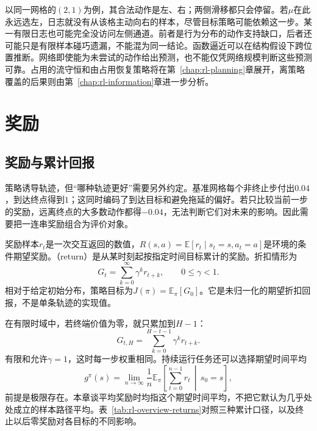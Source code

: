 以同一网格的$(2,1)$为例，其合法动作是左、右；两侧滑移都只会停留。若$\mu$在此永远选左，日志就没有从该格主动向右的样本，尽管目标策略可能依赖这一步。某一有限日志也可能完全没访问左侧通道。前者是行为分布的动作支持缺口，后者还可能只是有限样本碰巧遗漏，不能混为同一结论。函数逼近可以在结构假设下跨位置推断。网络即使能为未尝试的动作给出预测，也不能仅凭网络规模判断这些预测可靠。占用的流守恒和由占用恢复策略将在第~\ref{chap:rl-planning}章展开，离策略覆盖的后果则由第~\ref{chap:rl-information}章进一步分析。

\section{奖励}
\label{sec:rl-overview-rewards}

\subsection{奖励与累计回报}
\label{sec:rl-overview-return}

策略诱导轨迹，但“哪种轨迹更好”需要另外约定。基准网格每个非终止步付出$0.04$，到达终点得到$1$；这同时编码了到达目标和避免拖延的偏好。若只比较当前一步的奖励，远离终点的大多数动作都得$-0.04$，无法判断它们对未来的影响。因此需要把一连串奖励组合为评价对象。

\begin{definition}[回报与策略目标]
  \label{def:rl-overview-return}
  奖励样本$r_t$是一次交互返回的数值，$R(s,a)=\mathbb E[r_t\mid s_t=s,a_t=a]$是环境的条件期望奖励。（return）是从某时刻起按指定时间目标累计的奖励。折扣情形为
  \begin{equation}
    G_t=\sum_{k=0}^{\infty}\gamma^k r_{t+k},
    \qquad 0\leq\gamma<1.
    \label{eq:rl-overview-return}
  \end{equation}
  相对于给定初始分布，策略目标为$J(\pi)=\mathbb E_\pi[G_0]$。它是未归一化的期望折扣回报，不是单条轨迹的实现值。
\end{definition}

在有限时域中，若终端价值为零，就只累加到$H-1$：
\[
  G_{t,H}=\sum_{k=0}^{H-t-1}\gamma^k r_{t+k}.
\]
有限和允许$\gamma=1$，这时每一步权重相同。持续运行任务还可以选择期望时间平均
\[
  g^\pi(s)=\lim_{n\to\infty}\frac{1}{n}
    \mathbb E_\pi\left[\sum_{t=0}^{n-1}r_t\,\middle|\,s_0=s\right],
\]
前提是极限存在。本章谈平均奖励时均指这个期望时间平均，不把它默认为几乎处处成立的样本路径平均。表~\ref{tab:rl-overview-returns}对照三种累计口径，以及终止以后零奖励对各目标的不同影响。


